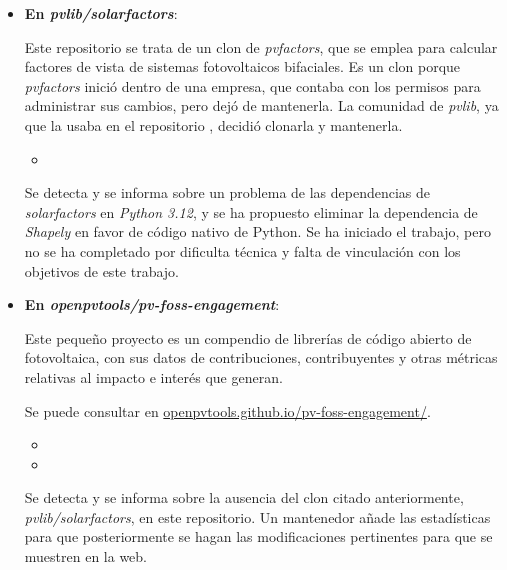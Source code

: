 \begin{itemize}

    \item \textbf{En \textit{pvlib/solarfactors}}:

          Este \gls{repositorio} se trata de un clon de \textit{pvfactors}, que se emplea para calcular factores de vista de sistemas fotovoltaicos bifaciales. Es un clon porque \textit{pvfactors} inició dentro de una empresa, que contaba con los permisos para administrar sus cambios, pero dejó de mantenerla. La comunidad de \textit{pvlib}, ya que la usaba en el repositorio \pvlibpy, decidió clonarla y mantenerla.

          \begin{itemize}
              \item {}
          \end{itemize}

          Se detecta y se informa sobre un problema de las dependencias de \textit{solarfactors} en \textit{Python 3.12}, y se ha propuesto eliminar la dependencia de \textit{Shapely} en favor de código nativo de Python. Se ha iniciado el trabajo, pero no se ha completado por dificulta técnica y falta de vinculación con los objetivos de este trabajo.

    \item \textbf{En \textit{openpvtools/pv-foss-engagement}}:

          Este pequeño proyecto es un compendio de librerías de código abierto de fotovoltaica, con sus datos de contribuciones, contribuyentes y otras métricas relativas al impacto e interés que generan.

          Se puede consultar en \href{https://openpvtools.github.io/pv-foss-engagement/}{openpvtools.github.io/pv-foss-engagement/}.

          \begin{itemize}
              \item {}
              \item {}
          \end{itemize}

          Se detecta y se informa sobre la ausencia del clon citado anteriormente, \textit{pvlib/solarfactors}, en este \gls{repositorio}. Un mantenedor añade las estadísticas para que posteriormente se hagan las modificaciones pertinentes para que se muestren en la web.


\end{itemize}
